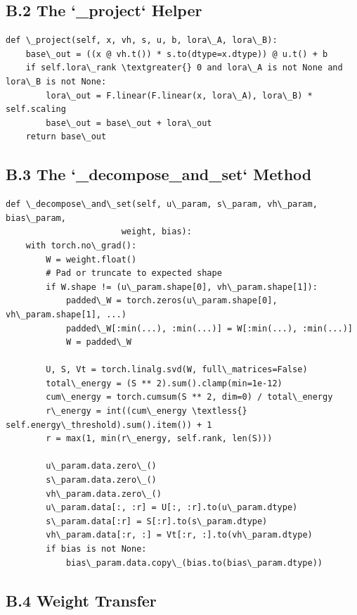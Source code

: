 \subsection{B.2 The `\_project` Helper}

\begin{lstlisting}
def \_project(self, x, vh, s, u, b, lora\_A, lora\_B):
    base\_out = ((x @ vh.t()) * s.to(dtype=x.dtype)) @ u.t() + b
    if self.lora\_rank \textgreater{} 0 and lora\_A is not None and lora\_B is not None:
        lora\_out = F.linear(F.linear(x, lora\_A), lora\_B) * self.scaling
        base\_out = base\_out + lora\_out
    return base\_out
\end{lstlisting}

\subsection{B.3 The `\_decompose\_and\_set` Method}

\begin{lstlisting}
def \_decompose\_and\_set(self, u\_param, s\_param, vh\_param, bias\_param,
                       weight, bias):
    with torch.no\_grad():
        W = weight.float()
        # Pad or truncate to expected shape
        if W.shape != (u\_param.shape[0], vh\_param.shape[1]):
            padded\_W = torch.zeros(u\_param.shape[0], vh\_param.shape[1], ...)
            padded\_W[:min(...), :min(...)] = W[:min(...), :min(...)]
            W = padded\_W
        
        U, S, Vt = torch.linalg.svd(W, full\_matrices=False)
        total\_energy = (S ** 2).sum().clamp(min=1e-12)
        cum\_energy = torch.cumsum(S ** 2, dim=0) / total\_energy
        r\_energy = int((cum\_energy \textless{} self.energy\_threshold).sum().item()) + 1
        r = max(1, min(r\_energy, self.rank, len(S)))
        
        u\_param.data.zero\_()
        s\_param.data.zero\_()
        vh\_param.data.zero\_()
        u\_param.data[:, :r] = U[:, :r].to(u\_param.dtype)
        s\_param.data[:r] = S[:r].to(s\_param.dtype)
        vh\_param.data[:r, :] = Vt[:r, :].to(vh\_param.dtype)
        if bias is not None:
            bias\_param.data.copy\_(bias.to(bias\_param.dtype))
\end{lstlisting}

\subsection{B.4 Weight Transfer}


